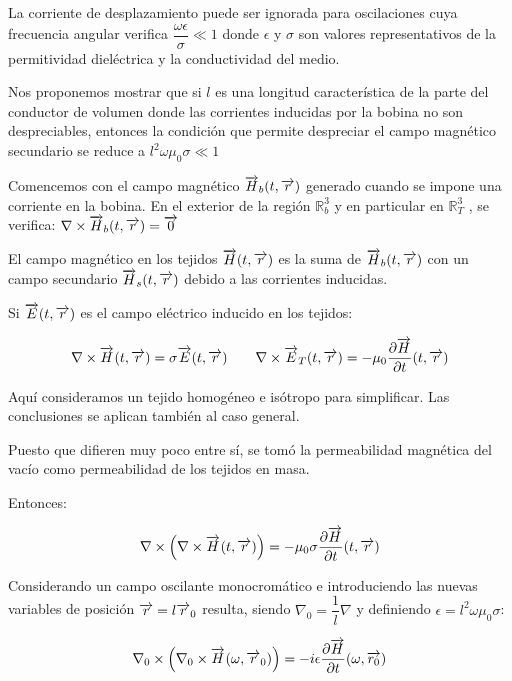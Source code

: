 La corriente de desplazamiento puede ser ignorada para oscilaciones cuya frecuencia angular verifica $\dfrac{\omega\epsilon}{\sigma} \ll 1$ donde $\epsilon$ y $\sigma$ son valores representativos de la permitividad dieléctrica y la conductividad del medio.

Nos proponemos mostrar que si $l$ es una longitud característica de la parte del conductor de volumen donde las corrientes inducidas por la bobina no son despreciables, entonces la condición que permite despreciar el campo magnético secundario se reduce a $l^{2}\omega\mu_{0}\sigma\ll 1$

Comencemos con el campo magnético $\overrightarrow{H}_{b}(t,\overrightarrow{r})$ generado cuando se impone una corriente en la bobina.
En el exterior de la región $\mathbb{R}^{3}_{b}$ y en particular en $\mathbb{R}^{3}_{T}$ , se verifica: $\nabla\times\overrightarrow{H}_{b}(t, \overrightarrow{r})=\overrightarrow{0}$

El campo magnético en los tejidos $\overrightarrow{H}(t,\overrightarrow{r})$ es la suma de $\overrightarrow{H}_{b}(t,\overrightarrow{r})$ con un campo secundario $\overrightarrow{H}_{s}(t,\overrightarrow{r})$ debido a las corrientes inducidas.

Si $\overrightarrow{E}(t,\overrightarrow{r})$ es el campo eléctrico inducido en los tejidos:

\begin{sloppypar}

\begin{equation}
	\nabla\times\overrightarrow{H}_{}(t, \overrightarrow{r}) = \sigma \overrightarrow{E}(t,\overrightarrow{r}) \quad \quad \nabla\times\overrightarrow{E}_{T}(t, \overrightarrow{r}) = -\mu_{0}\dfrac{\partial \overrightarrow{H}}{\partial t}(t,\overrightarrow{r})
\end{equation}

Aquí consideramos un tejido homogéneo e isótropo para simplificar. Las conclusiones se aplican también al caso general.

Puesto que difieren muy poco entre sí, se tomó la permeabilidad magnética del vacío como permeabilidad de los tejidos en masa. 

Entonces:

\begin{equation}
	\nabla \times \left( \nabla\times\overrightarrow{H}_{}(t, \overrightarrow{r})\right)  = -\mu_{0} \sigma \dfrac{\partial \overrightarrow{H}}{\partial t}(t,\overrightarrow{r})
\end{equation}

Considerando un campo oscilante monocromático e introduciendo las nuevas variables de posición $\overrightarrow{r}=l\overrightarrow{r}_{0}$ resulta, siendo $\nabla_{0}= \dfrac{1}{l}\nabla$ y definiendo $\epsilon=l^{2}\omega\mu_{0}\sigma$:

\end{sloppypar}

\begin{equation}
	\nabla_{0} \times \left( \nabla_{0}\times\overrightarrow{H}_{}(\omega, \overrightarrow{r}_{0})\right)  = - i\epsilon \dfrac{\partial \overrightarrow{H}}{\partial t}(\omega,\overrightarrow{r_{0}})
\end{equation}

